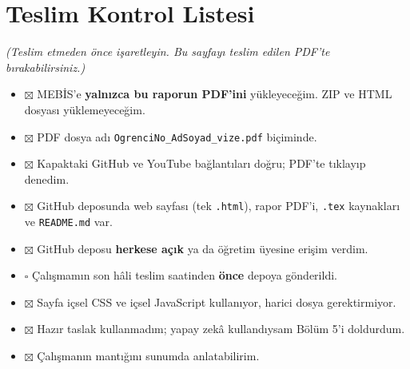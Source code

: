 \documentclass[12pt,a4paper]{article}
\newcommand{\aciklama}[1]{{\color{gray}\itshape (#1)}}
\begin{document}
\appendix
\section{Teslim Kontrol Listesi}
\aciklama{Teslim etmeden önce işaretleyin. Bu sayfayı teslim edilen PDF'te bırakabilirsiniz.}
\begin{itemize}
  \item[] $\boxtimes$ MEBİS'e \textbf{yalnızca bu raporun PDF'ini} yükleyeceğim. ZIP ve HTML dosyası yüklemeyeceğim.
  \item[] $\boxtimes$ PDF dosya adı \texttt{OgrenciNo\_AdSoyad\_vize.pdf} biçiminde.
  \item[] $\boxtimes$ Kapaktaki GitHub ve YouTube bağlantıları doğru; PDF'te tıklayıp denedim.
  \item[] $\boxtimes$ GitHub deposunda web sayfası (tek \texttt{.html}), rapor PDF'i, \texttt{.tex} kaynakları ve \texttt{README.md} var.
  \item[] $\boxtimes$ GitHub deposu \textbf{herkese açık} ya da öğretim üyesine erişim verdim.
  \item[] $\square$ Çalışmamın son hâli teslim saatinden \textbf{önce} depoya gönderildi.
  \item[] $\boxtimes$ Sayfa içsel CSS ve içsel JavaScript kullanıyor, harici dosya gerektirmiyor.
  \item[] $\boxtimes$ Hazır taslak kullanmadım; yapay zekâ kullandıysam Bölüm 5'i doldurdum.
  \item[] $\boxtimes$ Çalışmanın mantığını sunumda anlatabilirim.
\end{itemize}
\end{document}
